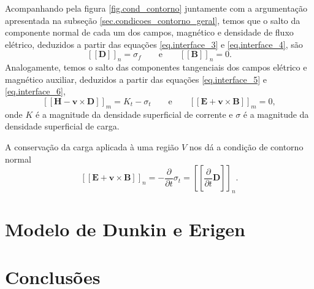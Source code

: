 Acompanhando pela figura \ref{fig.cond_contorno} juntamente com a argumenta\c{c}\~ao apresentada na subse\c{c}\~ao \ref{sec.condicoes_contorno_geral}, temos que o salto da componente normal de cada um dos campos, magn\'etico e densidade de fluxo el\'etrico, deduzidos a partir das equa\c{c}\~oes \ref{eq.interface_3} e \ref{eq.interface_4}, s\~ao
\begin{equation}
\left[\left[\mathbf{D}\right]\right]_n=\sigma_f\qquad\text{e}\qquad\left[\left[\mathbf{B}\right]\right]_n=0.
\end{equation}  
Analogamente, temos o salto das componentes tangenciais dos campos el\'etrico e magn\'etico auxiliar, deduzidos a partir das equa\c{c}\~oes \ref{eq.interface_5} e \ref{eq.interface_6},
\begin{equation}
\left[\left[\mathbf{H}-\mathbf{v}\times\mathbf{D}\right]\right]_m=K_t-\sigma_t\qquad\text{e}\qquad\left[\left[\mathbf{E}+\mathbf{v}\times\mathbf{B}\right]\right]_m=0,
\end{equation}
onde $K$ \'e a magnitude da densidade superficial de corrente e $\sigma$ \'e a magnitude da densidade superficial de carga.

A conserva\c{c}\~ao da carga aplicada \`a uma regi\~ao $V$ nos d\'a a condi\c{c}\~ao de contorno normal
\begin{equation}
\left[\left[\mathbf{E}+\mathbf{v}\times\mathbf{B}\right]\right]_n=-\frac{\partial}{\partial t}\sigma_t=\left[\left[\frac{\partial}{\partial t}\mathbf{D}\right]\right]_n.
\end{equation}

\section{Modelo de Dunkin e Erigen}






\section{Conclusões}